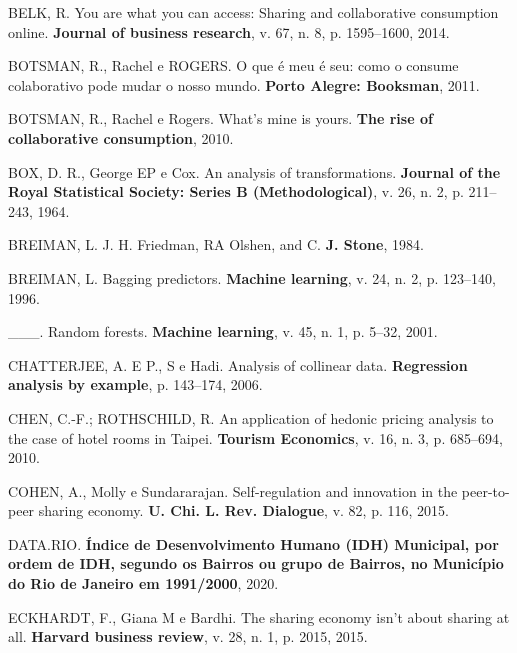 \documentclass[
	12pt,				%
	a4paper,		%
	oneside,    %
	chapter=TITLE,		   %
	section=TITLE,		   %
	subsection=TITLE,	   %
	subsubsection=TITLE, %
	english,			%
	french,				%
	spanish,			%
	brazil,				%
]{abntex2}
\begin{document}
\leavevmode\hypertarget{ref-belk2014you}{}%
BELK, R. You are what you can access: Sharing and collaborative
consumption online. \textbf{Journal of business research}, v. 67, n. 8,
p. 1595--1600, 2014.

\leavevmode\hypertarget{ref-botsman2011meu}{}%
BOTSMAN, R., Rachel e ROGERS. O que é meu é seu: como o consume
colaborativo pode mudar o nosso mundo. \textbf{Porto Alegre: Booksman},
2011.

\leavevmode\hypertarget{ref-botsman2010s}{}%
BOTSMAN, R., Rachel e Rogers. What's mine is yours. \textbf{The rise of
collaborative consumption}, 2010.

\leavevmode\hypertarget{ref-box1964analysis}{}%
BOX, D. R., George EP e Cox. An analysis of transformations.
\textbf{Journal of the Royal Statistical Society: Series B
(Methodological)}, v. 26, n. 2, p. 211--243, 1964.

\leavevmode\hypertarget{ref-breiman1984j}{}%
BREIMAN, L. J. H. Friedman, RA Olshen, and C. \textbf{J. Stone}, 1984.

\leavevmode\hypertarget{ref-breiman1996bagging}{}%
BREIMAN, L. Bagging predictors. \textbf{Machine learning}, v. 24, n. 2,
p. 123--140, 1996.

\leavevmode\hypertarget{ref-breiman2001random}{}%
\_\_\_. Random forests. \textbf{Machine learning}, v. 45, n. 1, p.
5--32, 2001.

\leavevmode\hypertarget{ref-chatterjee2006analysis}{}%
CHATTERJEE, A. E P., S e Hadi. Analysis of collinear data.
\textbf{Regression analysis by example}, p. 143--174, 2006.

\leavevmode\hypertarget{ref-chen2010application}{}%
CHEN, C.-F.; ROTHSCHILD, R. An application of hedonic pricing analysis
to the case of hotel rooms in Taipei. \textbf{Tourism Economics}, v. 16,
n. 3, p. 685--694, 2010.

\leavevmode\hypertarget{ref-cohen2015self}{}%
COHEN, A., Molly e Sundararajan. Self-regulation and innovation in the
peer-to-peer sharing economy. \textbf{U. Chi. L. Rev. Dialogue}, v. 82,
p. 116, 2015.

\leavevmode\hypertarget{ref-datario}{}%
DATA.RIO. \textbf{Índice de Desenvolvimento Humano (IDH) Municipal, por
ordem de IDH, segundo os Bairros ou grupo de Bairros, no Município do
Rio de Janeiro em 1991/2000}, 2020.

\leavevmode\hypertarget{ref-eckhardt2015sharing}{}%
ECKHARDT, F., Giana M e Bardhi. The sharing economy isn't about sharing
at all. \textbf{Harvard business review}, v. 28, n. 1, p. 2015, 2015.
\end{document}
